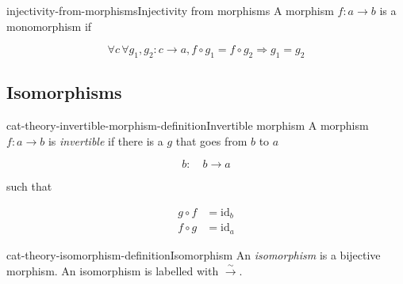 \documentclass[preview]{standalone}
\begin{document}
\begin{snippetdefinition}{injectivity-from-morphisms}{Injectivity from morphisms}
    A morphism \(f\colon a \rightarrow b\) is a monomorphism if
    
    \[
        \forall c\, \forall g_1, g_2: c \rightarrow a, 
        f \circ g_1 = f \circ g_2 \Rightarrow g_1 = g_2
    \]

    \begin{center}
    \end{center}
\end{snippetdefinition}

\subsection{Isomorphisms}

\begin{snippetdefinition}{cat-theory-invertible-morphism-definition}{Invertible morphism}
    A morphism \(f\colon a \rightarrow b\) is \textit{invertible} if there
    is a \function \(g\) that goes from \(b\) to \(a\)
    
    \[
        b:\quad b \rightarrow a
    \]
    
    such that
    
    \begin{align*}
        g \circ f &= \text{id}_b
        \\
        f \circ g &= \text{id}_a
    \end{align*}
    
    \begin{center}
    \end{center}
\end{snippetdefinition}

\begin{snippetdefinition}{cat-theory-isomorphism-definition}{Isomorphism}
    An \textit{isomorphism} is a bijective morphism.
    An isomorphism is labelled with \(\xrightarrow{\sim}\).
\end{snippetdefinition}

\end{document}

